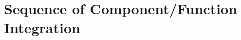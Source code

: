 \documentclass[../../../../testPlan.tex]{subfiles}
\begin{document}
	\section{Sequence of Component/Function Integration}

		

		
\end{document}

